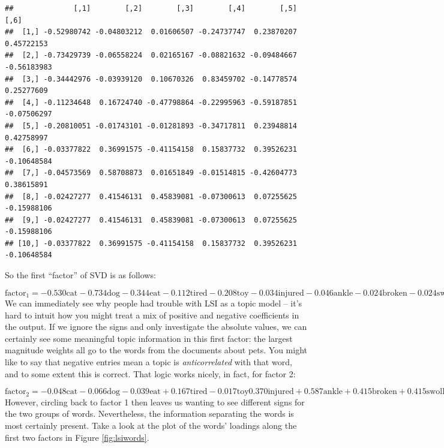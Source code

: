 \documentclass[
]{article}
\theoremstyle{definition}
\theoremstyle{definition}
\theoremstyle{definition}
\theoremstyle{definition}
\theoremstyle{remark}
\begin{document}
\begin{verbatim}
##              [,1]        [,2]        [,3]        [,4]        [,5]        [,6]
##  [1,] -0.52980742 -0.04803212  0.01606507 -0.24737747  0.23870207  0.45722153
##  [2,] -0.73429739 -0.06558224  0.02165167 -0.08821632 -0.09484667 -0.56183983
##  [3,] -0.34442976 -0.03939120  0.10670326  0.83459702 -0.14778574  0.25277609
##  [4,] -0.11234648  0.16724740 -0.47798864 -0.22995963 -0.59187851 -0.07506297
##  [5,] -0.20810051 -0.01743101 -0.01281893 -0.34717811  0.23948814  0.42758997
##  [6,] -0.03377822  0.36991575 -0.41154158  0.15837732  0.39526231 -0.10648584
##  [7,] -0.04573569  0.58708873  0.01651849 -0.01514815 -0.42604773  0.38615891
##  [8,] -0.02427277  0.41546131  0.45839081 -0.07300613  0.07255625 -0.15988106
##  [9,] -0.02427277  0.41546131  0.45839081 -0.07300613  0.07255625 -0.15988106
## [10,] -0.03377822  0.36991575 -0.41154158  0.15837732  0.39526231 -0.10648584
\end{verbatim}

So the first ``factor'' of SVD is as follows:

\[\text{factor}_1 = 
 -0.530 \text{cat} -0.734 \text{dog}-0.344 \text{eat}-0.112 \text{tired} -0.208 \text{toy}-0.034 \text{injured} -0.046 \text{ankle}-0.024 \text{broken} -0.024 \text{swollen} -0.034 \text{sprained} \]
We can immediately see why people had trouble with LSI as a topic model -- it's hard to intuit how you might treat a mix of positive and negative coefficients in the output. If we ignore the signs and only investigate the absolute values, we can certainly see some meaningful topic information in this first factor: the largest magnitude weights all go to the words from the documents about pets. You might like to say that negative entries mean a topic is \emph{anticorrelated} with that word, and to some extent this is correct. That logic works nicely, in fact, for factor 2:

\[\text{factor}_2 = -0.048\text{cat}-0.066\text{dog}-0.039\text{eat}+ 0.167\text{tired} -0.017\text{toy} 0.370\text{injured}+ 0.587\text{ankle}  +0.415\text{broken} + 0.415\text{swollen} + 0.370\text{sprained}\]
However, circling back to factor 1 then leaves us wanting to see different signs for the two groups of words. Nevertheless, the information separating the words is most certainly present. Take a look at the plot of the words' loadings along the first two factors in Figure \ref{fig:lsiwords}.

\hypertarget{htmlwidget-042daaadd673e391556e}{}
\end{document}
